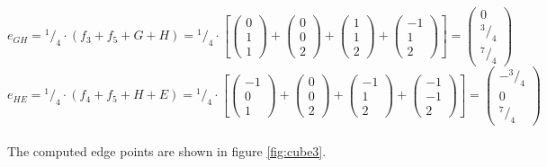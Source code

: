 \documentclass{article}
\newcommand*\rfrac[2]{{}^{#1}\!/_{#2}}%
\begin{document}
\[e_{GH}=\rfrac{1}{4}\cdot(f_3+f_5+G+H)=\rfrac{1}{4}\cdot\left[
\left({\begin{array}{c} 0 \\  1 \\ 1 \end{array}}\right)+
\left({\begin{array}{c} 0 \\ 0 \\ 2 \end{array}}\right)+
\left({\begin{array}{c} 1 \\ 1 \\ 2 \end{array}}\right)+
\left({\begin{array}{c} -1 \\  1 \\ 2 \end{array}}\right)\right]=
\left({\begin{array}{c}  0 \\ \rfrac{3}{4} \\ \rfrac{7}{4} \end{array}}\right)
\]
\[e_{HE}=\rfrac{1}{4}\cdot(f_4+f_5+H+E)=\rfrac{1}{4}\cdot\left[
\left({\begin{array}{c} -1 \\  0 \\ 1 \end{array}}\right)+
\left({\begin{array}{c} 0 \\ 0 \\ 2 \end{array}}\right)+
\left({\begin{array}{c} -1 \\ 1 \\ 2 \end{array}}\right)+
\left({\begin{array}{c} -1 \\  -1 \\ 2 \end{array}}\right)\right]=
\left({\begin{array}{c}  -\rfrac{3}{4} \\ 0 \\ \rfrac{7}{4} \end{array}}\right)
\]
\\
The computed edge points are shown in figure \ref{fig:cube3}.
\end{document}
